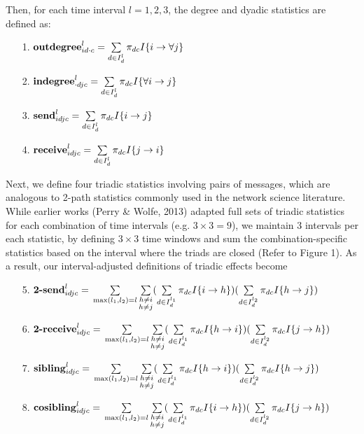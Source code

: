 \documentclass{article}
\begin{document}
 Then, for each time interval $l=1,2,3$, the degree and dyadic statistics are defined as:
 \begin{itemize}
 	 	\footnotesize
 	\item [1.]  $\mbox{\textbf{outdegree}}^l_{id\cdot c}=\sum\limits_{d \in I_{d}^{l}}\pi_{dc}I\{i\rightarrow \forall j\}$
 	\item [2.] $\mbox{\textbf{indegree}}^l_{\cdot dj c}=\sum\limits_{d \in I_{d}^{l}}\pi_{dc}I\{\forall i \rightarrow j\}$	 	 	
 	\item [3.]  $\mbox{\textbf{send}}^l_{idjc}=\sum\limits_{d \in I_{d}^{l}}\pi_{dc} I\{i\rightarrow j\}$
 	\item [4.] $\mbox{\textbf{receive}}^l_{idjc}=\sum\limits_{d\in I_{d}^{l}}\pi_{dc} I\{j\rightarrow i\}$
 \end{itemize}
 \normalsize
 Next, we define four triadic statistics involving pairs of messages, which are analogous to 2-path statistics commonly used in the network science literature. While earlier works (Perry \& Wolfe, 2013) adapted full sets of triadic statistics for each combination of time intervals (e.g. $3 \times 3=9$), we maintain 3 intervals per each statistic, by defining $3 \times 3$ time windows and sum the combination-specific statistics based on the interval where the triads are closed (Refer to Figure 1). As a result, our interval-adjusted definitions of triadic effects become
 \begin{itemize}
 	\footnotesize
 	\item [5.] $\mbox{\textbf{2-send}}^l_{idjc}=\vspace{3mm}\\\sum\limits_{\substack{\max(l_1,l_2)= l} }\sum\limits_{\substack{h \neq i\\h \neq  j} }(\sum\limits_{d\in I_{d}^{l_1}}\pi_{dc} I\{i\rightarrow h\})(\sum\limits_{d\in I_{d}^{l_2}}\pi_{dc}I\{h\rightarrow j\})$\\
 	\item [6.] $\mbox{\textbf{2-receive}}^l_{idjc}=\vspace{3mm}\\\sum\limits_{\substack{\max(l_1,l_2)= l} }\sum\limits_{\substack{h \neq i\\h \neq  j} }(\sum\limits_{d \in I_{d}^{l_1}}\pi_{dc} I\{h\rightarrow i\})(\sum\limits_{d\in I_{d}^{l_2}}\pi_{dc} I\{j\rightarrow h\})$
 	\item [7.] $\mbox{\textbf{sibling}}^l_{idjc}=\vspace{3mm}\\\sum\limits_{\substack{\max(l_1,l_2)= l} }\sum\limits_{\substack{h \neq i\\h \neq  j} }(\sum\limits_{d\in I_{d}^{l_1}}\pi_{dc} I\{h\rightarrow i\}) (\sum\limits_{d\in I_{d}^{l_2}}\pi_{dc}I\{h\rightarrow j\})$
 	\item [8.] $\mbox{\textbf{cosibling}}^l_{idjc}=\vspace{3mm}\\\sum\limits_{\substack{\max(l_1,l_2)= l}}\sum\limits_{\substack{h \neq i\\h \neq  j} }(\sum\limits_{d \in I_{d}^{l_1}}\pi_{dc} I\{i\rightarrow h\})(\sum\limits_{d\in I_{d}^{l_2}}\pi_{dc}I\{j\rightarrow h\})$
 \end{itemize}
\end{document}

